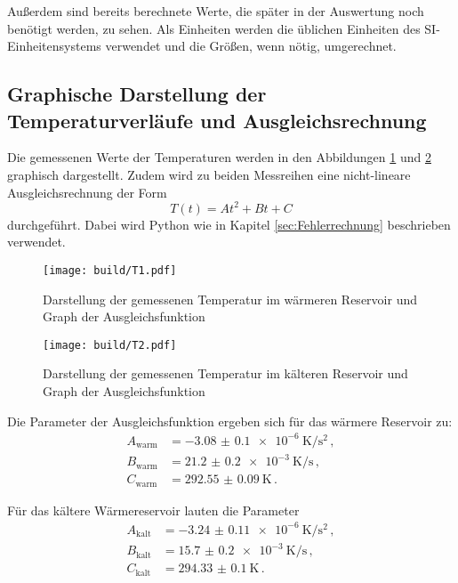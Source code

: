 Außerdem sind bereits berechnete Werte,
die später in der Auswertung noch benötigt werden, zu sehen. Als Einheiten werden
die üblichen Einheiten des SI-Einheitensystems verwendet und die Größen, wenn nötig,
umgerechnet.

\subsection{Graphische Darstellung der Temperaturverläufe und Ausgleichsrechnung}
Die gemessenen Werte der Temperaturen werden in den Abbildungen \ref{fig:temp1} und \ref{fig:temp2}
graphisch dargestellt. Zudem wird zu beiden Messreihen eine nicht-lineare
Ausgleichsrechnung der Form
\begin{equation}
  T(t)=At^2+Bt+C
\end{equation}
durchgeführt. Dabei wird Python wie in Kapitel \ref{sec:Fehlerrechnung} beschrieben
verwendet.

\begin{figure}
  \centering
  \texttt{[image: build/T1.pdf]}
  \caption{Darstellung der gemessenen Temperatur im wärmeren Reservoir
   und Graph der Ausgleichsfunktion}
  \label{fig:temp1}
\end{figure}

\begin{figure}
  \centering
  \texttt{[image: build/T2.pdf]}
  \caption{Darstellung der gemessenen Temperatur im kälteren Reservoir
   und Graph der Ausgleichsfunktion}
  \label{fig:temp2}
\end{figure}

Die Parameter der Ausgleichsfunktion ergeben sich für das wärmere Reservoir zu:
\begin{align*}
  A_\text{warm}&=\SI{-3.08(010)e-6}{\kelvin\per\second\squared}  \,, \\
  B_\text{warm}&=\SI{21.2(02)e-3}{\kelvin\per\second} \,,  \\
  C_\text{warm}&=\SI{292.55(009)}{\kelvin}  \,.
\end{align*}

Für das kältere Wärmereservoir lauten die Parameter
\begin{align*}
  A_\text{kalt}&=\SI{-3.24(011)e-6}{\kelvin\per\second\squared}  \,, \\
  B_\text{kalt}&=\SI{15.7(02)e-3}{\kelvin\per\second} \,,  \\
  C_\text{kalt}&=\SI{294.33(010)}{\kelvin}  \,.
\end{align*}



